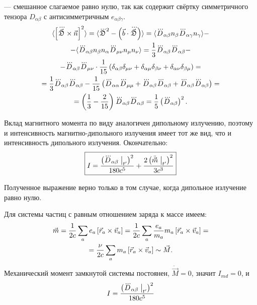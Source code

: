     --- смешанное слагаемое равно нулю, так как содержит свёртку симметричного тензора $D_{\alpha\beta}$ с 
    антисимметричным $e_{\alpha\beta\gamma}$.
    \begin{gather}
        \langle \left[{\dddot{\vec{\mathfrak{D}}} \times \vec{n}}\right]^2 \rangle = \langle \dddot{{\mathfrak{D}}}^2 - \left({\vec{b} \cdot \dddot{\vec{\mathfrak{D}}}}\right)\rangle =
        \langle \dddot{D}_{\alpha\beta} n_{\beta} \dddot{D}_{\alpha\gamma} n_{\gamma} \rangle - \\ -
        \langle \dddot{D}_{\alpha\beta} n_{\beta} n_{\alpha} \dddot{D}_{\mu\nu} n_{\mu} n_{\nu} \rangle =
        \frac 13 \dddot{D}_{\alpha\beta}\dddot{D}_{\alpha\beta} - \\ -
        \dddot{D}_{\alpha\beta} \dddot{D}_{\mu\nu} \cdot \frac 1{15}
        \left({\delta_{\alpha\beta}\delta_{\mu\nu} + \delta_{\alpha\mu}\delta_{\beta\nu} + \delta_{\alpha\nu}\delta_{\beta\mu}}\right) = \\ =
        \frac{1}{3} \dddot{D}_{\alpha\beta}\dddot{D}_{\alpha\beta} - \frac{1}{15}
        \left({\dddot{D}_{\alpha\alpha}\dddot{D}_{\mu\mu} + \dddot{D}_{\alpha\beta}\dddot{D}_{\alpha\beta} + \dddot{D}_{\alpha\beta}\dddot{D}_{\alpha\beta}}\right) = \\ =
        \left({\frac{1}{3} - \frac{2}{15}}\right)\dddot{D}_{\alpha\beta}\dddot{D}_{\alpha\beta} = \frac 15 \left({\dddot{D}_{\alpha\beta}}\right)^2.
    \end{gather}

    Вклад магнитного момента по виду аналогичен дипольному излучению, поэтому и интенсивность магнитно-дипольного излучения имеет тот же вид, что и
    интенсивность дипольного излучения. Окончательно:
    \[
        \boxed{I = \frac{\left({\dddot{D}_{\alpha\beta} \bigm|_{t'}}\right)^2}{180c^5} + \frac{2\left({\ddot{\vec{m}}\bigm|_{t'}}\right)^2}{3c^3}}
    \]

    \begin{note}
        Полученное выражение верно только в том случае, когда дипольное излучение равно нулю.
    \end{note}

    Для системы частиц с равным отношением заряда к массе имеем:
    \begin{gather*}
        \vec{m} = \frac{1}{2c}\sum_ae_a\left[{\vec r_a\times\vec v_a}\right] = \frac{1}{2c}\sum_a\frac{e_a}{m_a}m_a\left[{\vec r_a\times\vec v_a}\right] = \\ =
        \frac{\nu}{2c} \sum_a m_a\left[{\vec r_a\times\vec v_a}\right] \sim \vec{M}.
    \end{gather*}
    Механический момент замкнутой системы постоянен, $\ddot{\vec{M}} = 0$, значит $I_{md} = 0$, и
    \[
        I = \frac{\left({\dddot{D}_{\alpha\beta} \bigm|_{t'}}\right)^2}{180c^5}
    \]
